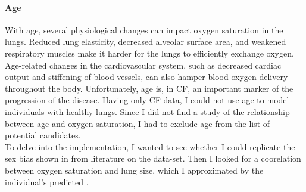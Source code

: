 \paragraph{Age}
With age, several physiological changes can impact oxygen saturation in the lungs. Reduced lung elasticity, decreased alveolar surface area, and weakened respiratory muscles make it harder for the lungs to efficiently exchange oxygen. Age-related changes in the cardiovascular system, such as decreased cardiac output and stiffening of blood vessels, can also hamper blood oxygen delivery throughout the body. Unfortunately, age is, in CF, an important marker of the progression of the disease. Having only CF data, I could not use age to model individuals with healthy lungs. Since I did not find a study of the relationship between age and oxygen saturation, I had to exclude age from the list of potential candidates. \\

To delve into the implementation, I wanted to see whether I could replicate the sex bias shown in \OXSat from literature on the \BR data-set. Then I looked for a coorelation between oxygen saturation and lung size, which I approximated by the individual's predicted \F.

